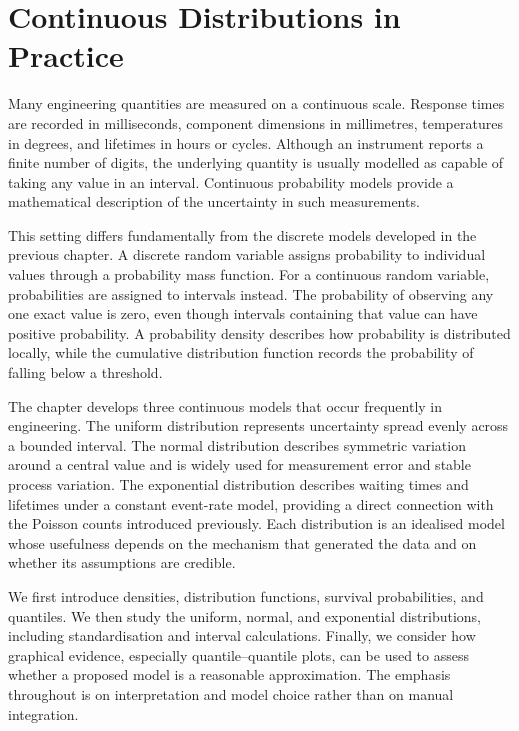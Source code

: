 \chapter{Continuous Distributions in Practice}
\label{ch:continuous-distributions}

Many engineering quantities are measured on a continuous scale. Response times are recorded in milliseconds, component dimensions in millimetres, temperatures in degrees, and lifetimes in hours or cycles. Although an instrument reports a finite number of digits, the underlying quantity is usually modelled as capable of taking any value in an interval. Continuous probability models provide a mathematical description of the uncertainty in such measurements.

This setting differs fundamentally from the discrete models developed in the previous chapter. A discrete random variable assigns probability to individual values through a probability mass function. For a continuous random variable, probabilities are assigned to intervals instead. The probability of observing any one exact value is zero, even though intervals containing that value can have positive probability. A probability density describes how probability is distributed locally, while the cumulative distribution function records the probability of falling below a threshold.

The chapter develops three continuous models that occur frequently in engineering. The uniform distribution represents uncertainty spread evenly across a bounded interval. The normal distribution describes symmetric variation around a central value and is widely used for measurement error and stable process variation. The exponential distribution describes waiting times and lifetimes under a constant event-rate model, providing a direct connection with the Poisson counts introduced previously. Each distribution is an idealised model whose usefulness depends on the mechanism that generated the data and on whether its assumptions are credible.

We first introduce densities, distribution functions, survival probabilities, and quantiles. We then study the uniform, normal, and exponential distributions, including standardisation and interval calculations. Finally, we consider how graphical evidence, especially quantile--quantile plots, can be used to assess whether a proposed model is a reasonable approximation. The emphasis throughout is on interpretation and model choice rather than on manual integration.


